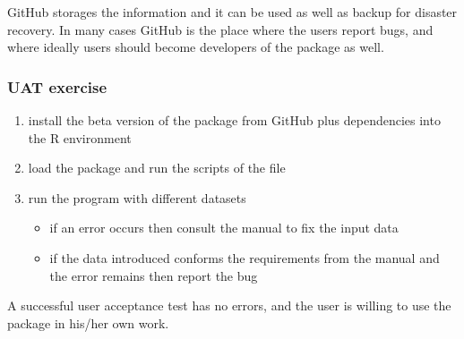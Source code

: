 \documentclass[oneside,a4paper]{memoir} %
\begin{document}
GitHub storages the information and it can be used as well as backup for disaster recovery. In many cases GitHub is the place where the users report bugs, and where ideally users should become developers of the package as well. 


\subsubsection{UAT exercise}

\begin{enumerate}
	\item install the beta version of the package from GitHub plus dependencies into the R environment  
	\item load the package and run the scripts of the  file
	\item run the program with different datasets
	\begin{itemize}\small
		\item if an error occurs then consult the manual to fix the input data
		\item if the data introduced conforms the requirements from the manual and the error remains then report the bug
	\end{itemize}
\end{enumerate}

\bigbreak
\noindent
A successful user acceptance test has no errors, and the user is willing to use the package in his/her own work. 
\end{document}
